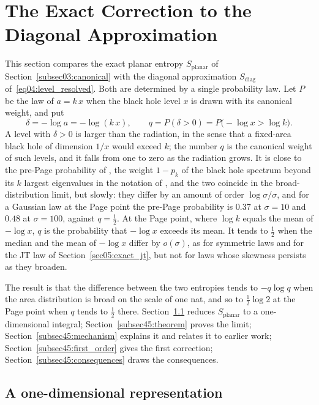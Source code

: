 \documentclass[11pt,letterpaper]{article}
\theoremstyle{plain}
\theoremstyle{definition}
\theoremstyle{remark}
\begin{document}
\section{The Exact Correction to the Diagonal Approximation}
\label{sec45:exact_correction}

This section compares the exact planar entropy $S_{\mathrm{planar}}$ of Section~\ref{subsec03:canonical} with the diagonal approximation $S_{\mathrm{diag}}$ of~\eqref{eq04:level_resolved}. Both are determined by a single probability law. Let $P$ be the law of $a = k\,x$ when the black hole level $x$ is drawn with its canonical weight, and put
\begin{equation}
\label{eq45:delta}
\delta = -\log a = -\log(k\,x), \qquad q = P(\delta > 0) = P\big(-\log x > \log k\big).
\end{equation}
A level with $\delta > 0$ is larger than the radiation, in the sense that a fixed-area black hole of dimension $1/x$ would exceed $k$; the number $q$ is the canonical weight of such levels, and it falls from one to zero as the radiation grows. It is close to the pre-Page probability of \citet{akersetal2022}, the weight $1 - p_k$ of the black hole spectrum beyond its $k$ largest eigenvalues in the notation of \citet{pssyetal2022}, and the two coincide in the broad-distribution limit, but slowly: they differ by an amount of order $\log\sigma/\sigma$, and for a Gaussian law at the Page point the pre-Page probability is $0.37$ at $\sigma = 10$ and $0.48$ at $\sigma = 100$, against $q = \tfrac12$. At the Page point, where $\log k$ equals the mean of $-\log x$, $q$ is the probability that $-\log x$ exceeds its mean. It tends to $\tfrac12$ when the median and the mean of $-\log x$ differ by $o(\sigma)$, as for symmetric laws and for the JT law of Section~\ref{sec05:exact_jt}, but not for laws whose skewness persists as they broaden.

The result is that the difference between the two entropies tends to $-q\log q$ when the area distribution is broad on the scale of one nat, and so to $\tfrac12\log 2$ at the Page point when $q$ tends to $\tfrac12$ there. Section~\ref{subsec45:representation} reduces $S_{\mathrm{planar}}$ to a one-dimensional integral; Section~\ref{subsec45:theorem} proves the limit; Section~\ref{subsec45:mechanism} explains it and relates it to earlier work; Section~\ref{subsec45:first_order} gives the first correction; Section~\ref{subsec45:consequences} draws the consequences.

\subsection{A one-dimensional representation}
\label{subsec45:representation}
\end{document}
